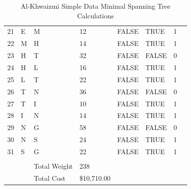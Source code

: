\documentclass[11pt]{book}
\renewcommand{\=}[1]{\stackrel{#1}{=}} %
\theoremstyle{definition}
\theoremstyle{remark}
\begin{document}
\begin{table}[]
\begin{tabular}{llllllll}
21 & E & M & 12 & FALSE & TRUE & \cellcolor[HTML]{67FD9A}1 &  \\
22 & M & H & 14 & FALSE & TRUE & \cellcolor[HTML]{67FD9A}1 &  \\
23 & H & T & 32 & FALSE & FALSE & \cellcolor[HTML]{FD6864}0 &  \\
24 & H & L & 16 & FALSE & TRUE & \cellcolor[HTML]{67FD9A}1 &  \\
25 & L & T & 22 & FALSE & TRUE & \cellcolor[HTML]{67FD9A}1 &  \\
26 & T & N & 36 & FALSE & FALSE & \cellcolor[HTML]{FD6864}0 &  \\
27 & T & I & 10 & FALSE & TRUE & \cellcolor[HTML]{67FD9A}1 &  \\
28 & I & N & 14 & FALSE & TRUE & \cellcolor[HTML]{67FD9A}1 &  \\
29 & N & G & 58 & FALSE & FALSE & \cellcolor[HTML]{FD6864}0 &  \\
30 & N & S & 24 & FALSE & TRUE & \cellcolor[HTML]{67FD9A}1 &  \\
31 & S & G & 22 & FALSE & TRUE & \cellcolor[HTML]{67FD9A}1 &  \\
 &  &  &  &  &  &  &  \\
 &  & Total Weight & 238 &  &  &  &  \\
 &  & Total Cost & \$10,710.00 &  &  &  & 
\end{tabular}
\caption{Al-Khwaizmi Simple Data Minimal Spanning Tree Calculations}
\label{tab:my-table}
\end{table}
\end{document}
